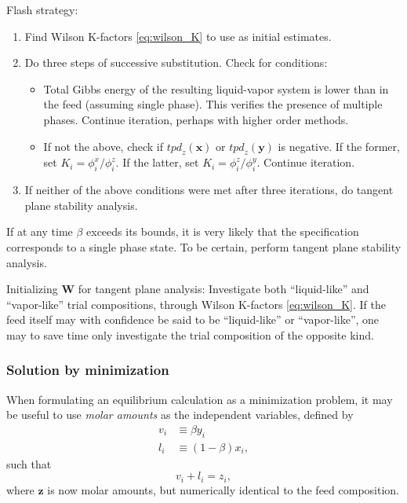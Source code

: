 \documentclass[internal,english]{sintefmemo2012}
\newcommand*{\vektor}[1]{\boldsymbol{#1}}%
\begin{document}
Flash strategy:
\begin{enumerate}
  \item Find Wilson K-factors \eqref{eq:wilson_K} to use as initial estimates.
  \item Do three steps of successive substitution. Check for conditions:
    \begin{itemize}
      \item Total Gibbs energy of the resulting liquid-vapor system is lower than in the feed (assuming single phase). This verifies the presence of 
              multiple phases. Continue iteration, perhaps with higher order methods.
      \item If not the above, check  if $\mathit{tpd}_z(\vektor{x})$ or $\mathit{tpd}_z(\vektor{y})$ is negative. If the former, set 
        $K_i = \phi_i^x / \phi_i^z$. If the latter, set $K_i = \phi_i^z / \phi_i^y$. Continue iteration.
    \end{itemize}
  \item If neither of the above conditions were met after three iterations, do tangent plane stability analysis.
\end{enumerate}
If at any time $\beta$ exceeds its bounds, it is very likely that the specification corresponds to a single phase state. 
To be certain, perform tangent plane stability analysis.


Initializing $\vektor{W}$ for tangent plane analysis: 
Investigate both ``liquid-like'' and ``vapor-like'' trial compositions, through 
Wilson K-factors \eqref{eq:wilson_K}. If the feed itself may with confidence be said to be ``liquid-like'' or ``vapor-like'', 
one may to save time only investigate the trial composition of the opposite kind.



\subsubsection{Solution by minimization}
When formulating an equilibrium calculation as a minimization problem, it 
may be useful to use \textit{molar amounts} as the independent variables, 
defined by 
\begin{align}
  v_i &\equiv \beta y_i\nonumber\\
  l_i &\equiv (1-\beta) x_i,
  \label{}
\end{align}
such that
\begin{equation}
  v_i + l_i = z_i,
  \label{}
\end{equation}
where $\vektor{z}$ is now molar amounts, but numerically identical to the feed composition.
\end{document}
